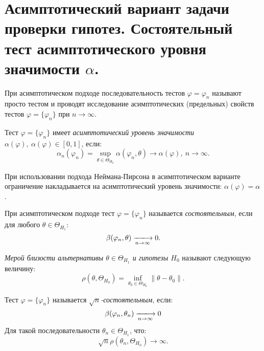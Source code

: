 \section{Асимптотический вариант задачи проверки гипотез. Состоятельный тест
асимптотического уровня значимости $\alpha$.}

При асимптотическом подходе последовательность тестов $\varphi = \varphi_n$
называют просто тестом и проводят исследование асимптотических (предельных)
свойств тестов $\varphi = \{\varphi_n\}$ при $n \to \infty$.\\

\begin{definition}
  Тест $\varphi = \{\varphi_n\}$ имеет \textit{асимптотический уровень
  значимости $\alpha(\varphi),~ \alpha(\varphi) \in \left[0, 1 \right]$}, если:
  \[
    \alpha_n(\varphi_n) =
    \sup_{\theta \in \Theta_{H_0}} \alpha(\varphi_n, \theta) \to
    \alpha(\varphi),~ n \to \infty
  .\]
\end{definition}

При использовании подхода Неймана-Пирсона в асимптотическом варианте ограничение
накладывается на асимптотический уровень значимости: $\alpha(\varphi) = \alpha$.

\begin{definition}
  При асимптотическом подходе тест $\varphi = \{\varphi_n\}$ называется
  \textit{состоятельным}, если для любого $\theta \in \Theta_{H_1}$:
  \[
    \beta(\varphi_n, \theta) \xlongrightarrow[n \to \infty]{} 0
  .\]
\end{definition}


\begin{definition}
  \textit{Мерой близости альтернативы $\theta \in \Theta_{H_1}$ и гипотезы
  $H_0$} называют следующую величину:
  \[
    \rho(\theta, \Theta_{H_0}) = \inf_{\theta_0 \in \Theta_{H_0}}
    \left\lVert \theta - \theta_0 \right\rVert
  .\]
\end{definition}

\begin{definition}
  Тест $\varphi = \{\varphi_n\}$ называется \textit{$\sqrt{n}$-состоятельным},
  если:
  \[
    \beta(\varphi_n, \theta_n) \xlongrightarrow[n \to \infty]{} 0
  \]
  Для такой последовательности $\theta_n \in \Theta_{H_1}$, что:
  \[
    \sqrt{n} \rho(\theta_n, \Theta_{H_0}) \to \infty
  .\]
\end{definition}
